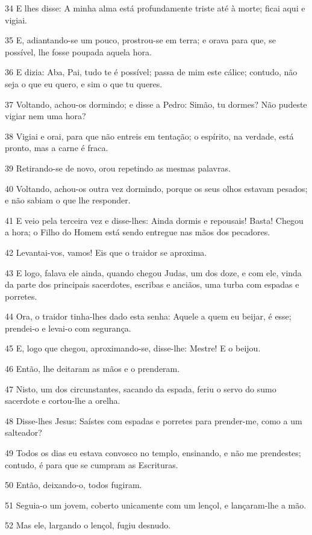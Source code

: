 \par 34 E lhes disse: A minha alma está profundamente triste até à morte; ficai aqui e vigiai.
\par 35 E, adiantando-se um pouco, prostrou-se em terra; e orava para que, se possível, lhe fosse poupada aquela hora.
\par 36 E dizia: Aba, Pai, tudo te é possível; passa de mim este cálice; contudo, não seja o que eu quero, e sim o que tu queres.
\par 37 Voltando, achou-os dormindo; e disse a Pedro: Simão, tu dormes? Não pudeste vigiar nem uma hora?
\par 38 Vigiai e orai, para que não entreis em tentação; o espírito, na verdade, está pronto, mas a carne é fraca.
\par 39 Retirando-se de novo, orou repetindo as mesmas palavras.
\par 40 Voltando, achou-os outra vez dormindo, porque os seus olhos estavam pesados; e não sabiam o que lhe responder.
\par 41 E veio pela terceira vez e disse-lhes: Ainda dormis e repousais! Basta! Chegou a hora; o Filho do Homem está sendo entregue nas mãos dos pecadores.
\par 42 Levantai-vos, vamos! Eis que o traidor se aproxima.
\par 43 E logo, falava ele ainda, quando chegou Judas, um dos doze, e com ele, vinda da parte dos principais sacerdotes, escribas e anciãos, uma turba com espadas e porretes.
\par 44 Ora, o traidor tinha-lhes dado esta senha: Aquele a quem eu beijar, é esse; prendei-o e levai-o com segurança.
\par 45 E, logo que chegou, aproximando-se, disse-lhe: Mestre! E o beijou.
\par 46 Então, lhe deitaram as mãos e o prenderam.
\par 47 Nisto, um dos circunstantes, sacando da espada, feriu o servo do sumo sacerdote e cortou-lhe a orelha.
\par 48 Disse-lhes Jesus: Saístes com espadas e porretes para prender-me, como a um salteador?
\par 49 Todos os dias eu estava convosco no templo, ensinando, e não me prendestes; contudo, é para que se cumpram as Escrituras.
\par 50 Então, deixando-o, todos fugiram.
\par 51 Seguia-o um jovem, coberto unicamente com um lençol, e lançaram-lhe a mão.
\par 52 Mas ele, largando o lençol, fugiu desnudo.
